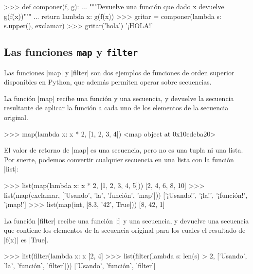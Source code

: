 \begin{subappendices}
\begin{codigo-python-sn}
>>> def componer(f, g):
...     """Devuelve una función que dado x devuelve g(f(x))"""
...     return lambda x: g(f(x))
>>> gritar = componer(lambda s: s.upper(), exclamar)
>>> gritar('hola')
'¡HOLA!'
\end{codigo-python-sn}

\subsection*{Las funciones \texttt{map} y \texttt{filter}}

Las funciones |map| y |filter| son dos ejemplos de funciones de orden superior
disponibles en Python, que además permiten operar sobre secuencias.

La función |map| recibe una función y una secuencia, y devuelve la secuencia
resultante de aplicar la función a cada uno de los elementos de la secuencia
original.

\begin{codigo-python-sn}
>>> map(lambda x: x * 2, [1, 2, 3, 4])
<map object at 0x10edcba20>
\end{codigo-python-sn}

El valor de retorno de |map| es una secuencia, pero no es una tupla ni una
lista. Por suerte, podemos convertir cualquier secuencia en una lista con la
función |list|:

\begin{codigo-python-sn}
>>> list(map(lambda x: x * 2, [1, 2, 3, 4, 5]))
[2, 4, 6, 8, 10]
>>> list(map(exclamar, ['Usando', 'la', 'función', 'map']))
['¡Usando!', '¡la!', '¡función!', '¡map!']
>>> list(map(int, [8.3, '42', True]))
[8, 42, 1]
\end{codigo-python-sn}

La función |filter| recibe una función |f| y una secuencia, y devuelve una secuencia
que contiene los elementos de la secuencia original para los cuales el
resultado de |f(x)| es |True|.

\begin{codigo-python-sn}
>>> list(filter(lambda x: x %
[2, 4]
>>> list(filter(lambda s: len(s) > 2, ['Usando', 'la', 'función', 'filter']))
['Usando', 'función', 'filter']
\end{codigo-python-sn}
\end{subappendices}
